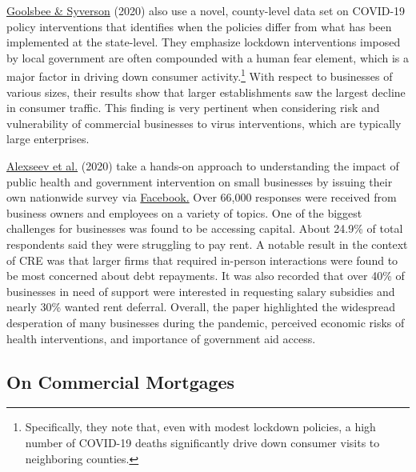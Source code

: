 \documentclass[11pt]{article} %
\begin{document}
\hyperlink{Goolsbee}{Goolsbee \& Syverson} (2020) also use a novel, county-level data set on COVID-19 policy interventions that identifies when the policies differ from what has been implemented at the state-level. They emphasize lockdown interventions imposed by local government are often compounded with a human fear element, which is a major factor in driving down consumer activity.\footnote{Specifically, they note that, even with modest lockdown policies, a high number of COVID-19 deaths significantly drive down consumer visits to neighboring counties.} With respect to businesses of various sizes, their results show that larger establishments saw the largest decline in consumer traffic. This finding is very pertinent when considering risk and vulnerability of commercial businesses to virus interventions, which are typically large enterprises.

 \hyperlink{Alexseev}{Alexseev et al.} (2020) take a hands-on approach to understanding the impact of public health and government intervention on small businesses by issuing their own nationwide survey via \href{https://www.facebook.com/}{Facebook.} Over 66,000 responses were received from business owners and employees on a variety of topics. One of the biggest challenges for businesses was found to be accessing capital. About 24.9\% of total respondents said they were struggling to pay rent. A  notable result in the context of CRE was that larger firms that required in-person interactions were found to be most concerned about debt repayments. It was also recorded that over 40\% of businesses in need of support were interested in requesting salary subsidies and nearly 30\% wanted rent deferral. Overall, the paper highlighted the widespread desperation of many businesses during the pandemic, perceived economic risks of health interventions, and importance of government aid access. 

\subsection{On Commercial Mortgages}
\end{document}
